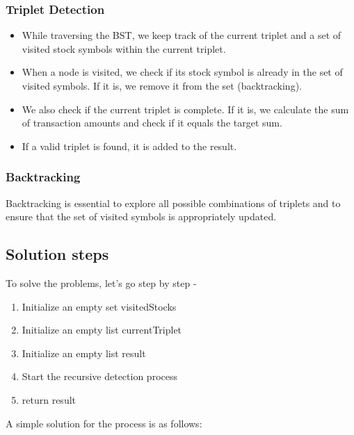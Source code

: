\documentclass[11pt]{article}
\begin{document}
\subsubsection{Triplet Detection}
\begin{itemize}
    \item While traversing the BST, we keep track of the current triplet and a set of visited stock symbols within the current triplet.
    \item When a node is visited, we check if its stock symbol is already in the set of visited symbols. If it is, we remove it from the set (backtracking).
    \item We also check if the current triplet is complete. If it is, we calculate the sum of transaction amounts and check if it equals the target sum.
    \item If a valid triplet is found, it is added to the result.
\end{itemize}

\subsubsection{Backtracking}
Backtracking is essential to explore all possible combinations of triplets and to ensure that the set of visited symbols is appropriately updated.

    \subsection{Solution steps}
    To solve the problems, let's go step by step -
    \begin{enumerate}
        \item Initialize an empty set visitedStocks
        \item Initialize an empty list currentTriplet
        \item Initialize an empty list result
        \item Start the recursive detection process
        \item return result
    \end{enumerate}

    A simple solution for the process is as follows: 
\end{document}

